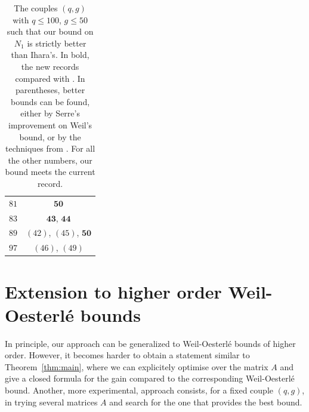 \documentclass{amsart}
\begin{document}
\begin{center}
\begin{table}[!h]
\begin{tabular}{ c    c   }
$81$ & $\textbf{50}$\\
$83$ & $\textbf{43}$,  $\textbf{44}$\\
$89$ & $(42)$,  $(45)$, $\textbf{50}$\\
$97$ & $(46)$,  $(49)$\\
\hline
\end{tabular}
\caption{The couples $(q,g)$ with $q \leq 100$, $g\leq 50$ such that our bound on $N_1$ is strictly better than Ihara's. In bold, the new records compared with \cite{MP}. In parentheses, better bounds can be found, either by Serre's improvement on Weil's bound, or by the techniques from \cite{HL03, HL12}.
For all the other numbers, our bound meets the current record.}
\label{tab:MP}
\end{table}
\end{center} 

%

\section{Extension to higher order Weil-Oesterl\'e bounds}\label{sec:extensions}




In principle, our approach can be generalized to Weil-Oesterl\'e bounds of higher order. 
However, it becomes harder to obtain a statement similar to Theorem~\ref{thm:main}, where we can explicitely optimise over the matrix $A$ and give a closed formula for the gain compared to the corresponding Weil-Oesterl\'e bound.
Another, more experimental, approach consists, for a fixed couple $(q,g)$, in trying several matrices $A$ and search for the one that provides the best bound.
\end{document}
